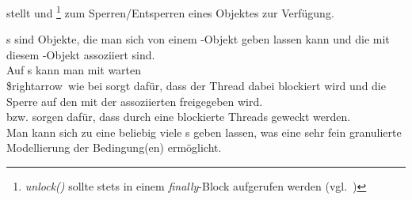 \noindent
{} stellt  und \footnote{
    \textit{unlock()} sollte stets in einem \textit{finally}-Block aufgerufen werden (vgl.~\cite[150]{Oec22})
} zum Sperren/Entsperren eines Objektes zur Verfügung.

\noindent
{}s sind Objekte, die man sich von einem -Objekt geben lassen kann und die mit diesem -Objekt assoziiert sind.\\
Auf s kann man mit  warten\\
\$rightarrow\ wie bei  sorgt  dafür, dass der Thread dabei blockiert wird und die Sperre auf den mit der  assoziierten  freigegeben wird.\\
 bzw.  sorgen dafür, dass durch eine  blockierte Threads geweckt werden.\\

\noindent
Man kann sich zu eine  beliebig viele s geben lassen, was eine sehr fein granulierte Modellierung der Bedingung(en) ermöglicht.\\

